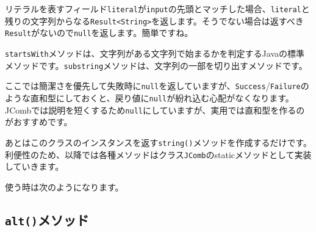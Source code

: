 リテラルを表すフィールド\texttt{literal}が\texttt{input}の先頭とマッチした場合、\texttt{literal}と残りの文字列からなる\texttt{Result\textless{}String\textgreater{}}を返します。そうでない場合は返すべき\texttt{Result}がないので\texttt{null}を返します。簡単ですね。

\texttt{startsWith}メソッドは、文字列がある文字列で始まるかを判定するJavaの標準メソッドです。\texttt{substring}メソッドは、文字列の一部を切り出すメソッドです。

ここでは簡潔さを優先して失敗時に\texttt{null}を返していますが、\texttt{Success}/\texttt{Failure}のような直和型にしておくと、戻り値に\texttt{null}が紛れ込む心配がなくなります。JCombでは説明を短くするため\texttt{null}にしていますが、実用では直和型を作るのがおすすめです。

あとはこのクラスのインスタンスを返す\texttt{string()}メソッドを作成するだけです。利便性のため、以降では各種メソッドはクラス\texttt{JComb}のstaticメソッドとして実装していきます。

\begin{Shaded}
\begin{Highlighting}[]
 
   \NormalTok{\textgreater{} }\NormalTok{(}
      
\NormalTok{  \}}
\NormalTok{\}}
\end{Highlighting}
\end{Shaded}

使う時は次のようになります。

\begin{Shaded}
\begin{Highlighting}[]
\NormalTok{(}\NormalTok{);}
 \NormalTok{\textless{}}\NormalTok{\textgreater{}(}\NormalTok{, }\NormalTok{(}\NormalTok{));}
\NormalTok{(}\NormalTok{);}
\end{Highlighting}
\end{Shaded}

\hypertarget{chapter6-altux30e1ux30bdux30c3ux30c9}{%
\subsection{\texorpdfstring{\texttt{alt()}メソッド}{alt()メソッド}}\label{chapter6-altux30e1ux30bdux30c3ux30c9}}

